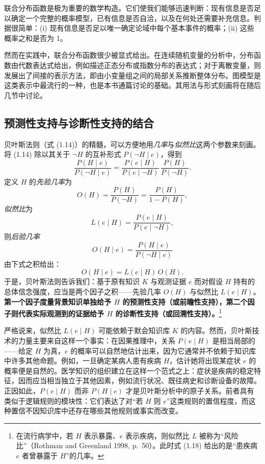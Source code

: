 联合分布函数是极为重要的数学构造。它们使我们能够迅速判断：现有信息是否足以确定一个完整的概率模型，已有信息是否自洽，以及在何处还需要补充信息。判据很简单：(i) 现有信息是否足以唯一确定论域中每个基本事件的概率；(ii) 这些概率之和是否为 1。

然而在实践中，联合分布函数很少被显式给出。在连续随机变量的分析中，分布函数由代数表达式给出，例如描述正态分布或指数分布的表达式；对于离散变量，则发展出了间接的表示方法，即由小变量组之间的局部关系推断整体分布。图模型是这类表示中最流行的一种，也是本书通篇讨论的基础。其用法与形式刻画将在随后几节中讨论。

\subsection{预测性支持与诊断性支持的结合}

贝叶斯法则（式 \textup{(1.14)}）的精髓，可以方便地用\emph{几率}与\emph{似然比}这两个参数来刻画。将 \textup{(1.14)} 除以其关于 $\neg H$ 的互补形式 $P(\neg H\mid e)$，得到
\begin{equation}
\frac{P(H\mid e)}{P(\neg H\mid e)} = \frac{P(e\mid H)}{P(e\mid\neg H)}\,\frac{P(H)}{P(\neg H)}. \tag{1.15}
\end{equation}
定义 $H$ 的\emph{先验几率}为
\begin{equation}
O(H) = \frac{P(H)}{P(\neg H)} = \frac{P(H)}{1-P(H)}, \tag{1.16}
\end{equation}
\emph{似然比}为
\begin{equation}
L(e\mid H) = \frac{P(e\mid H)}{P(e\mid\neg H)}, \tag{1.17}
\end{equation}
则\emph{后验几率}
\begin{equation}
O(H\mid e) = \frac{P(H\mid e)}{P(\neg H\mid e)} \tag{1.18}
\end{equation}
由下式之积给出：
\begin{equation}
O(H\mid e) = L(e\mid H)\,O(H). \tag{1.19}
\end{equation}
于是，贝叶斯法则告诉我们：基于原有知识 $K$ 与观测证据 $e$ 而对假设 $H$ 持有的总体信念强度，应当是两个因子之积——先验几率 $O(H)$ 与似然比 $L(e\mid H)$。\textbf{第一个因子度量背景知识单独给予 $H$ 的预测性支持（或前瞻性支持），第二个因子则代表实际观测到的证据给予 $H$ 的诊断性支持（或回溯性支持）。}\footnote{在流行病学中，若 $H$ 表示暴露、$e$ 表示疾病，则似然比 $L$ 被称为“风险比”（Rothman and Greenland 1998, p.~50）。此时式 \textup{(1.18)} 给出的是“患疾病 $e$ 者曾暴露于 $H$”的几率。}

严格说来，似然比 $L(e\mid H)$ 可能依赖于默会知识库 $K$ 的内容。然而，贝叶斯技术的力量主要来自这样一个事实：在因果推理中，关系 $P(e\mid H)$ 是相当局部的——给定 $H$ 为真，$e$ 的概率可以自然地估计出来，因为它通常并不依赖于知识库中许多其他命题。例如，一旦确定某病人患有疾病 $H$，估计她将出现某症状 $e$ 的概率便是自然的。医学知识的组织建立在这样一个范式之上：症状是疾病的稳定特征，因而应当相当独立于其他因素，例如流行状况、既往病史和诊断设备的故障。正因如此，$P(e\mid H)$ 而非 $P(H\mid e)$ 才是贝叶斯分析中的原子关系。前者具有类似于逻辑规则的模块性：它们表达了对“若 $H$ 则 $e$”这类规则的置信程度，而这种置信不因知识库中还存在哪些其他规则或事实而改变。

